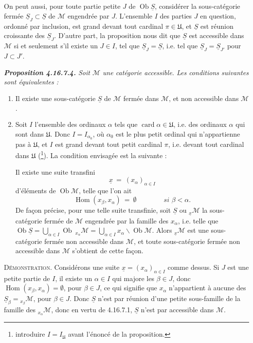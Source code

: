 \documentclass[11pt]{article}
\newcommand{\printedpage}[1]{\marginpar{\footnotesize p.~#1}}
\newcommand{\msp}[1]{\marginpar{\footnotesize [#1]}}
\newcommand{\cM}{\mathcal{M}}
\newcommand{\Ob}{\operatorname{Ob}}
\newcommand{\Hom}{\operatorname{Hom}}
\newcommand{\card}{\operatorname{card}}
\newcommand{\uS}{\underline{S}}
\newcommand{\U}{\mathfrak{U}}
\begin{document}
\printedpage{186}

On peut aussi, pour toute partie petite $J$ de $\Ob \uS$, considérer la sous-catégorie fermée $\uS_J \subset \uS$ de $\cM$ engendrée par $J$. L'ensemble $I$ des parties $J$ en question, ordonné par inclusion, est grand devant tout cardinal $\pi \in \U$, et $\uS$ est réunion croissante des $\uS_J$. D'autre part, la proposition nous dit que $\uS$ est accessible dans $\cM$ si et seulement s'il existe un $J \in I$, tel que $\uS_J = \uS$, i.e. tel que $\uS_J = \uS_{J'}$ pour $J \subset J'$.

\begingroup\itshape
\noindent\textbf{\upshape Proposition 4.16.7.4.} Soit $\cM$ une catégorie accessible. Les conditions suivantes sont équivalentes :
\begin{enumerate}[label={}]
\item[a)] Il existe une sous-catégorie $\uS$ de $\cM$ fermée dans $\cM$, et non accessible dans $\cM$.
\item[b)] Soit $I$ l'ensemble des ordinaux $\alpha$ tels que $\card \alpha \in \U$, i.e. des
\msp{page 481}
ordinaux $\alpha$ qui sont dans $\U$. Donc $I = I_{\alpha_0}$, où $\alpha_0$ est le plus petit ordinal qui n'appartienne pas à $\U$, et $I$ est grand devant tout petit cardinal $\pi$, i.e. devant tout cardinal dans $\U$ \textup{(}\footnote{introduire $I = I_{\U}$ avant l'énoncé de la proposition.}\textup{)}. La condition envisagée est la suivante :

Il existe une suite transfini %
\[
\underline{x} \ =\ (x_\alpha)_{\alpha\in I}
\]
d'éléments de $\Ob \cM$, telle que l'on ait
\[
\Hom(x_\beta, x_\alpha) \ =\ \emptyset \qquad\qquad \textit{si } \beta < \alpha.
\]
De façon précise, pour une telle suite transfinie, soit $\uS$ ou ${}_{\underline{x}}\cM$ la sous-catégorie fermée de $\cM$ engendrée par la famille des $x_\alpha$, i.e. telle que $\Ob \uS = \bigcup_{\alpha\in I} \Ob\ {}_{x_\alpha}\cM = \bigcup_{\alpha\in I} x_\alpha\backslash\Ob \cM$. Alors ${}_{\underline{x}}\cM$ est une sous-catégorie fermée non accessible dans $\cM$, et toute sous-catégorie fermée non accessible dans $\cM$ s'obtient de cette façon.
\end{enumerate}
\endgroup

\textsc{Démonstration}. Considérons une suite $\underline{x} = (x_\alpha)_{\alpha\in I}$ comme dessus. Si $J$ est une petite partie de $I$, il existe un $\alpha \in I$ qui majore les $\beta \in J$, donc $\Hom(x_\beta, x_\alpha) = \emptyset$, pour $\beta \in J$,
\msp{page 482}
ce qui signifie que $x_\alpha$ n'appartient à aucune des $\uS_\beta = {}_{x_\beta}\cM$, pour $\beta \in J$. Donc $\uS$ n'est par réunion d'une petite sous-famille de la famille des ${}_{x_\alpha}\cM$, donc en vertu de 4.16.7.1, $\uS$ n'est par accessible dans $\cM$. %
\end{document}
